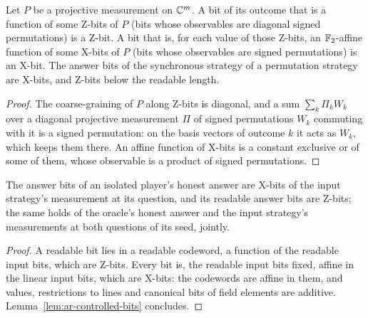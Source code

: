 \begin{lemma}
\label{lem:ar-controlled-bits}
\leanok
Let $P$ be a projective measurement on $\mathbb{C}^m$. A bit of its outcome that is a function of some
Z-bits of $P$ (bits whose observables are diagonal signed permutations) is a Z-bit. A bit that is,
for each value of those Z-bits, an $\mathbb{F}_2$-affine function of some X-bits of $P$ (bits whose
observables are signed permutations) is an X-bit. The answer bits of the synchronous strategy of a
permutation strategy are X-bits, and Z-bits below the readable length.
\end{lemma}

\begin{proof}
\leanok
The coarse-graining of $P$ along Z-bits is diagonal, and a sum $\sum_k \Pi_k W_k$ over a diagonal
projective measurement $\Pi$ of signed permutations $W_k$ commuting with it is a signed
permutation: on the basis vectors of outcome $k$ it acts as $W_k$, which keeps them there. An
affine function of X-bits is a constant exclusive or of some of them, whose observable is a product
of signed permutations.
\end{proof}

\begin{lemma}
\label{lem:ar-honest-bits}
\leanok
The answer bits of an isolated player's honest answer are X-bits of the input strategy's
measurement at its question, and its readable answer bits are Z-bits; the same holds of the
oracle's honest answer and the input strategy's measurements at both questions of its seed,
jointly.
\end{lemma}

\begin{proof}
\leanok
A readable bit lies in a readable codeword, a function of the readable input bits, which are
Z-bits. Every bit is, the readable input bits fixed, affine in the linear input bits, which are
X-bits: the codewords are affine in them, and values, restrictions to lines and canonical bits of
field elements are additive. Lemma~\ref{lem:ar-controlled-bits} concludes.
\end{proof}

